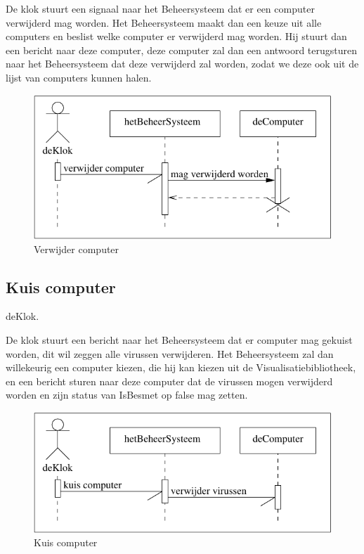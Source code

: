\documentclass[a4paper,oneside]{report}
\begin{document}
De klok stuurt een signaal naar het Beheersysteem dat er een computer verwijderd mag worden. Het Beheersysteem maakt dan een keuze uit alle computers en beslist welke computer er verwijderd mag worden. Hij stuurt dan een bericht naar deze computer, deze computer zal dan een antwoord terugsturen naar het Beheersysteem dat deze verwijderd zal worden, zodat we deze ook uit de lijst van computers kunnen halen.

\begin{figure}[h!]
\begin{center}
\includegraphics{seq_verwijder_computer}
\caption{Verwijder computer}
\end{center}
\end{figure}

\newpage
\subsection{Kuis computer}
deKlok.

De klok stuurt een bericht naar het Beheersysteem dat er computer mag gekuist worden, dit wil zeggen alle virussen verwijderen. Het Beheersysteem zal dan willekeurig een computer kiezen, die hij kan kiezen uit de Visualisatiebibliotheek, en een bericht sturen naar deze computer dat de virussen mogen verwijderd worden en zijn status van IsBesmet op false mag zetten.

\begin{figure}[h!]
\begin{center}
\includegraphics{seq_kuis_computer}
\caption{Kuis computer}
\end{center}
\end{figure}
\end{document}
